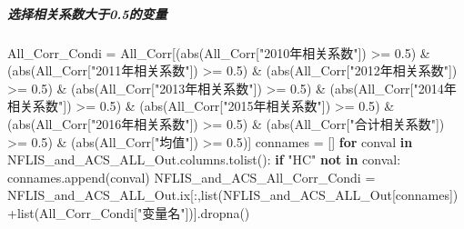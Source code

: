 \documentclass[
]{article}
\newenvironment{Shaded}{}{}
\newcommand{\BuiltInTok}[1]{#1}
\newcommand{\ControlFlowTok}[1]{\textcolor[rgb]{0.00,0.44,0.13}{\textbf{#1}}}
\newcommand{\FloatTok}[1]{\textcolor[rgb]{0.25,0.63,0.44}{#1}}
\newcommand{\KeywordTok}[1]{\textcolor[rgb]{0.00,0.44,0.13}{\textbf{#1}}}
\newcommand{\NormalTok}[1]{#1}
\newcommand{\OperatorTok}[1]{\textcolor[rgb]{0.40,0.40,0.40}{#1}}
\newcommand{\StringTok}[1]{\textcolor[rgb]{0.25,0.44,0.63}{#1}}
\begin{document}
\hypertarget{header-n270}{%
\subparagraph{选择相关系数大于0.5的变量}\label{header-n270}}

\begin{Shaded}
\begin{Highlighting}[]
\NormalTok{All\_Corr\_Condi }\OperatorTok{=}\NormalTok{ All\_Corr[(}\BuiltInTok{abs}\NormalTok{(All\_Corr[}\StringTok{"2010年相关系数"}\NormalTok{]) }\OperatorTok{\textgreater{}=} \FloatTok{0.5}\NormalTok{) }
                                       \OperatorTok{\&}\NormalTok{ (}\BuiltInTok{abs}\NormalTok{(All\_Corr[}\StringTok{"2011年相关系数"}\NormalTok{]) }\OperatorTok{\textgreater{}=} \FloatTok{0.5}\NormalTok{)}
                                       \OperatorTok{\&}\NormalTok{ (}\BuiltInTok{abs}\NormalTok{(All\_Corr[}\StringTok{"2012年相关系数"}\NormalTok{]) }\OperatorTok{\textgreater{}=} \FloatTok{0.5}\NormalTok{)}
                                       \OperatorTok{\&}\NormalTok{ (}\BuiltInTok{abs}\NormalTok{(All\_Corr[}\StringTok{"2013年相关系数"}\NormalTok{]) }\OperatorTok{\textgreater{}=} \FloatTok{0.5}\NormalTok{)}
                                       \OperatorTok{\&}\NormalTok{ (}\BuiltInTok{abs}\NormalTok{(All\_Corr[}\StringTok{"2014年相关系数"}\NormalTok{]) }\OperatorTok{\textgreater{}=} \FloatTok{0.5}\NormalTok{)}
                                       \OperatorTok{\&}\NormalTok{ (}\BuiltInTok{abs}\NormalTok{(All\_Corr[}\StringTok{"2015年相关系数"}\NormalTok{]) }\OperatorTok{\textgreater{}=} \FloatTok{0.5}\NormalTok{)}
                                       \OperatorTok{\&}\NormalTok{ (}\BuiltInTok{abs}\NormalTok{(All\_Corr[}\StringTok{"2016年相关系数"}\NormalTok{]) }\OperatorTok{\textgreater{}=} \FloatTok{0.5}\NormalTok{)}
                                       \OperatorTok{\&}\NormalTok{ (}\BuiltInTok{abs}\NormalTok{(All\_Corr[}\StringTok{"合计相关系数"}\NormalTok{]) }\OperatorTok{\textgreater{}=} \FloatTok{0.5}\NormalTok{)}
                                       \OperatorTok{\&}\NormalTok{ (}\BuiltInTok{abs}\NormalTok{(All\_Corr[}\StringTok{"均值"}\NormalTok{]) }\OperatorTok{\textgreater{}=} \FloatTok{0.5}\NormalTok{)]}
\NormalTok{connames }\OperatorTok{=}\NormalTok{ []}
\ControlFlowTok{for}\NormalTok{ conval }\KeywordTok{in}\NormalTok{ NFLIS\_and\_ACS\_ALL\_Out.columns.tolist():}
    \ControlFlowTok{if} \StringTok{"HC"} \KeywordTok{not} \KeywordTok{in}\NormalTok{ conval:}
\NormalTok{        connames.append(conval)}
\NormalTok{NFLIS\_and\_ACS\_All\_Corr\_Condi }\OperatorTok{=}\NormalTok{ NFLIS\_and\_ACS\_ALL\_Out.ix[:,}\BuiltInTok{list}\NormalTok{(NFLIS\_and\_ACS\_ALL\_Out[connames])}\OperatorTok{+}\BuiltInTok{list}\NormalTok{(All\_Corr\_Condi[}\StringTok{"变量名"}\NormalTok{])].dropna()   }
\end{Highlighting}
\end{Shaded}
\end{document}

